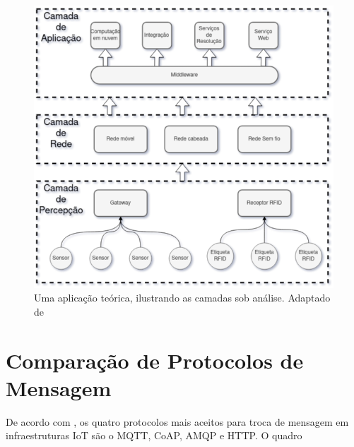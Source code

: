 \documentclass[tcc,capa]{texufpel}
\begin{document}
\begin{figure}[h]
    \centering
    \includegraphics[scale=0.6]{camadas.png}
    \caption{Uma aplicação teórica, ilustrando as camadas sob análise. Adaptado de \cite{schiller}}
    \label{fig:layers}
\end{figure}


\chapter{Comparação de Protocolos de Mensagem}

De acordo com \citet{choice}, os quatro protocolos mais aceitos para troca de mensagem em infraestruturas IoT são o MQTT, CoAP, AMQP e HTTP. O quadro
\end{document}
